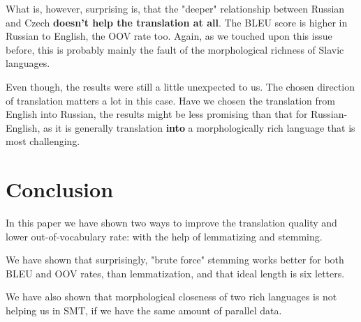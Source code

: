 \documentclass[11pt,letterpaper]{article}
\begin{document}
What is, however, surprising is, that the "deeper" relationship between Russian and Czech \textbf{doesn't help the translation at all}. The BLEU score is higher in Russian to English, the OOV rate too. Again, as we touched upon this issue before, this is probably mainly the fault of the morphological richness of Slavic languages. 

Even though, the results were still a little unexpected to us. 
The chosen direction of translation matters a lot in this case. Have we chosen the translation from English into Russian,
the results might be less promising than that for Russian-English, as it is generally translation \textbf{into} 
a morphologically rich language that is most challenging. 

\section{Conclusion}
In this paper we have shown two ways to improve the translation quality and lower out-of-vocabulary rate: with the help of lemmatizing and stemming. 


We have shown that surprisingly, "brute force" stemming works better for both BLEU and OOV rates, than lemmatization, and that ideal length is six letters. 

We have also shown that morphological closeness of two rich languages is not helping us in SMT, if we have the same amount of parallel data.




\end{document}
